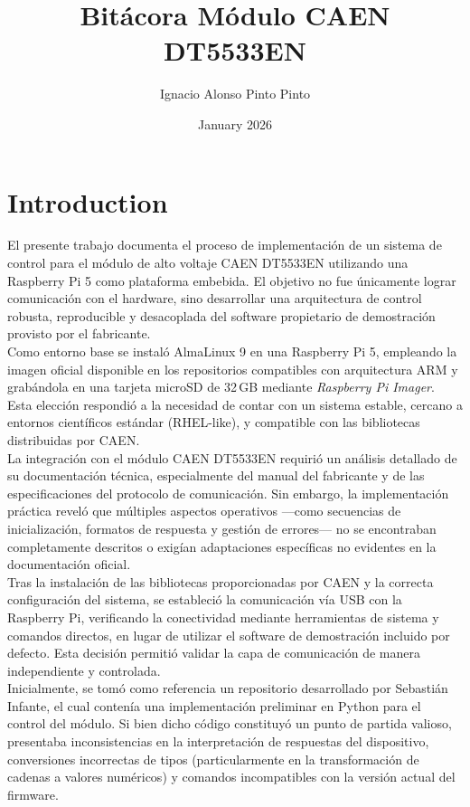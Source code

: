 \documentclass{article}
\title{Bitácora Módulo CAEN DT5533EN}
\author{Ignacio Alonso Pinto Pinto}
\date{January 2026}
\begin{document}
\maketitle

\section{Introduction}

El presente trabajo documenta el proceso de implementación de un sistema de control para el módulo de alto voltaje CAEN DT5533EN utilizando una Raspberry Pi 5 como plataforma embebida. El objetivo no fue únicamente lograr comunicación con el hardware, sino desarrollar una arquitectura de control robusta, reproducible y desacoplada del software propietario de demostración provisto por el fabricante.\\

Como entorno base se instaló AlmaLinux 9 en una Raspberry Pi 5, empleando la imagen oficial disponible en los repositorios compatibles con arquitectura ARM y grabándola en una tarjeta microSD de 32\,GB mediante \textit{Raspberry Pi Imager}. Esta elección respondió a la necesidad de contar con un sistema estable, cercano a entornos científicos estándar (RHEL-like), y compatible con las bibliotecas distribuidas por CAEN.\\

La integración con el módulo CAEN DT5533EN requirió un análisis detallado de su documentación técnica, especialmente del manual del fabricante y de las especificaciones del protocolo de comunicación. Sin embargo, la implementación práctica reveló que múltiples aspectos operativos —como secuencias de inicialización, formatos de respuesta y gestión de errores— no se encontraban completamente descritos o exigían adaptaciones específicas no evidentes en la documentación oficial.\\

Tras la instalación de las bibliotecas proporcionadas por CAEN y la correcta configuración del sistema, se estableció la comunicación vía USB con la Raspberry Pi, verificando la conectividad mediante herramientas de sistema y comandos directos, en lugar de utilizar el software de demostración incluido por defecto. Esta decisión permitió validar la capa de comunicación de manera independiente y controlada.\\

Inicialmente, se tomó como referencia un repositorio desarrollado por Sebastián Infante, el cual contenía una implementación preliminar en Python para el control del módulo. Si bien dicho código constituyó un punto de partida valioso, presentaba inconsistencias en la interpretación de respuestas del dispositivo, conversiones incorrectas de tipos (particularmente en la transformación de cadenas a valores numéricos) y comandos incompatibles con la versión actual del firmware.\\
\end{document}
